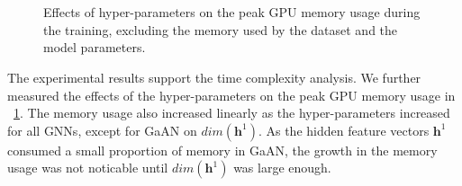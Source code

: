 \begin{figure}
    \centering
    \\
    \\
    \caption{Effects of hyper-parameters on the peak GPU memory usage during the training, excluding the memory used by the dataset and the model parameters.}
    \label{fig:exp_hyperparameter_memory_usage}
\end{figure}

The experimental results support the time complexity analysis.
We further measured the effects of the hyper-parameters on the peak GPU memory usage in \figurename~\ref{fig:exp_hyperparameter_memory_usage}.
The memory usage also increased linearly as the hyper-parameters increased for all GNNs, except for GaAN on $dim(\boldsymbol{h}^1)$.
As the hidden feature vectors $\boldsymbol{h}^1$ consumed a small proportion of memory in GaAN, the growth in the memory usage was not noticable until $dim(\boldsymbol{h}^1)$ was large enough.

